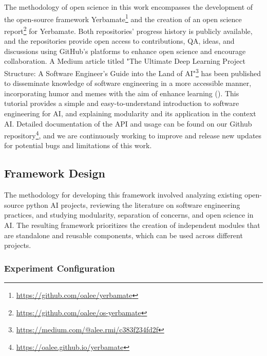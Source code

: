 The methodology of open science in this work encompasses the development of the open-source framework Yerbamate\footnote{\url{https://github.com/oalee/yerbamate}} and the creation of an open science report\footnote{ \url{https://github.com/oalee/os-yerbamate}} for Yerbamate. Both repositories' progress history is publicly available, and the repositories provide open access to contributions, QA, ideas, and discussions using GitHub's platforms to enhance open science and encourage collaboration. A Medium article titled "The Ultimate Deep Learning Project Structure: A Software Engineer’s Guide into the Land of AI"\footnote{\url{https://medium.com/@alee.rmi/c383f234fd2f}} has been published to disseminate knowledge of software engineering in a more accessible manner, incorporating humor and memes with the aim of enhance learning (\cite{powell1985humour}). This tutorial provides a simple and easy-to-understand introduction to software engineering for AI, and explaining modularity and its application in the context AI. Detailed documentation of the API and usage can be found on our Github repository\footnote{\url{https://oalee.github.io/yerbamate}}, and we are continuously working to improve and release new updates for potential bugs and limitations of this work.


\subsection{Framework Design}
The methodology for developing this framework involved analyzing existing open-source python AI projects, reviewing the literature on software engineering practices, and studying modularity, separation of concerns, and open science in AI. The resulting framework prioritizes the creation of independent modules that are standalone and reusable components, which can be used across different projects.

\subsubsection{Experiment Configuration}

